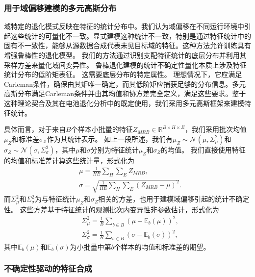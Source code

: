 \documentclass[UTF8,lettersize,journal]{IEEEtran}
\begin{document}
\subsubsection{用于域偏移建模的多元高斯分布}

域特定的退化模式反映在特征的统计分布中。我们认为域偏移在不同运行环境中引起这些统计的可量化不一致。显式建模这种统计不一致，特别是通过特征统计中的固有不一致性，能够从源数据合成代表未见目标域的特征。这种方法允许训练具有增强鲁棒性的退化模型。
我们的方法通过识别支配特征统计的底层分布并利用其采样方差来量化域间变异性。
% 
鲁棒退化建模的统计不确定性量化本质上涉及特征统计分布的低阶矩表征。
这需要底层分布的特定属性。
理想情况下，它应满足Carleman条件\cite{akhiezer2020classical}，确保由其矩唯一确定，而其低阶矩应捕获足够的分布信息。多元高斯分布满足Carleman条件并由其均值和协方差完全定义，满足这些要求。鉴于这种理论契合及其在电池退化分析中的既定使用，我们采用多元高斯框架来建模特征统计。

具体而言，对于来自$B$个样本小批量的特征$Z_{MRB} \in \mathbb{R}^{B \times H \times E}$，我们采用批次均值$\mu_{Z}$和标准差$\sigma_{Z}$作为其统计表示。
如上一段所述，我们有$\mu_{Z} \sim \mathcal{N}(\mu, \Sigma_{\mu}^{2})$和$\sigma_{Z} \sim \mathcal{N}(\sigma, \Sigma_{\sigma}^{2})$，其中$\mu$和$\sigma$分别为特征统计$\mu_{Z}$和$\sigma_{Z}$的均值。
我们直接使用特征的均值和标准差计算这些统计量，形式化为
\begin{align}
    & \mu=\frac{1}{HE}\sum_{H}\sum_{E}Z_{MRB}, \\
    & \sigma = \sqrt{\frac{1}{HE}\sum_{H}\sum_{E}(Z_{MRB} - \mu)^{2}}.
\end{align}
而$\Sigma_{\mu}^{2}$和$\Sigma_{\sigma}^{2}$为与特征统计$\mu_{Z}$和$\sigma_{Z}$相关的方差，也用于建模域偏移引起的统计不确定性。
这些方差基于特征统计的观测批次内变异性非参数估计，形式化为
\begin{align}
    & \Sigma_{\mu}^{2}=\frac{1}{B}\sum_{b\in B}(\mu-\mathbb{E}_{b}(\mu))^{2}, \\
    & \Sigma_{\sigma}^{2} = \frac{1}{B}\sum_{b\in B}(\sigma-\mathbb{E}_{b}(\sigma))^{2},
\end{align}
其中$\mathbb{E}_{b}(\mu)$和$\mathbb{E}_{b}(\sigma)$为小批量中第$b$个样本的均值和标准差的期望。

\subsubsection{不确定性驱动的特征合成}
\end{document}
